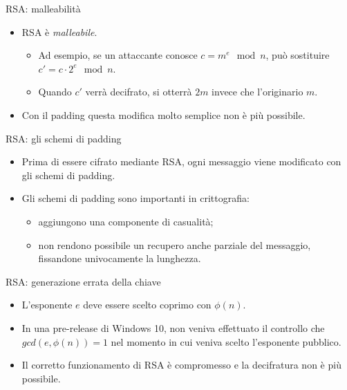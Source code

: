\documentclass[11pt,svgnames,smaller,aspectratio=169,italian]{beamer}
\begin{document}
\begin{frame}{RSA: malleabilità}
	\begin{itemize}
		\item RSA è \emph{malleabile}.
			\begin{itemize}
				\item Ad esempio, se un attaccante conosce $c = m^{e} \mod n$, può sostituire $c' = c \cdot 2^{e} \mod n$.
				\item Quando $c'$ verrà decifrato, si otterrà $2m$ invece che l'originario $m$.
			\end{itemize}
		\item Con il padding questa modifica molto semplice non è più possibile.
	\end{itemize}
\end{frame}

\begin{frame}{RSA: gli schemi di padding}
	\begin{itemize}
		\item Prima di essere cifrato mediante RSA, ogni messaggio viene modificato con gli schemi di padding.
		\item Gli schemi di padding sono importanti in crittografia:
			\begin{itemize}
				\item aggiungono una componente di casualità;
				\item non rendono possibile un recupero anche parziale del messaggio, fissandone univocamente la lunghezza.
			\end{itemize}
	\end{itemize}
\end{frame}

\begin{frame}{RSA: generazione errata della chiave}
	\begin{itemize}
		\item L'esponente $e$ deve essere scelto coprimo con $\phi(n)$.
		\item In una pre-release di Windows 10, non veniva effettuato il controllo che $gcd(e,\phi(n)) = 1$ nel momento in cui veniva scelto l'esponente pubblico.
		\item Il corretto funzionamento di RSA è compromesso e la decifratura non è più possibile.
	\end{itemize}
\end{frame}
\end{document}

